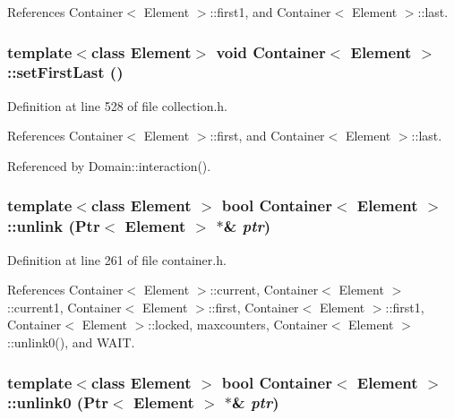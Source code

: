 References Container$<$ Element $>$::first1, and Container$<$ Element $>$::last.\hypertarget{classContainer_a5153442b1a8eae3df4444d53460d5fc}{
\subsubsection[{setFirstLast}]{\setlength{\rightskip}{0pt plus 5cm}template$<$class Element$>$ void {\bf Container}$<$ Element $>$::setFirstLast ()}}
\label{classContainer_a5153442b1a8eae3df4444d53460d5fc}




Definition at line 528 of file collection.h.

References Container$<$ Element $>$::first, and Container$<$ Element $>$::last.

Referenced by Domain::interaction().\hypertarget{classContainer_5ed98bbad945ed3cae7eb39d53b8b408}{
\subsubsection[{unlink}]{\setlength{\rightskip}{0pt plus 5cm}template$<$class Element $>$ bool {\bf Container}$<$ Element $>$::unlink ({\bf Ptr}$<$ Element $>$ $\ast$\& {\em ptr})}}
\label{classContainer_5ed98bbad945ed3cae7eb39d53b8b408}




Definition at line 261 of file container.h.

References Container$<$ Element $>$::current, Container$<$ Element $>$::current1, Container$<$ Element $>$::first, Container$<$ Element $>$::first1, Container$<$ Element $>$::locked, maxcounters, Container$<$ Element $>$::unlink0(), and WAIT.\hypertarget{classContainer_180ea8c2ef56cffb22a6684e7b1e93ed}{
\subsubsection[{unlink0}]{\setlength{\rightskip}{0pt plus 5cm}template$<$class Element $>$ bool {\bf Container}$<$ Element $>$::unlink0 ({\bf Ptr}$<$ Element $>$ $\ast$\& {\em ptr})}}
\label{classContainer_180ea8c2ef56cffb22a6684e7b1e93ed}




